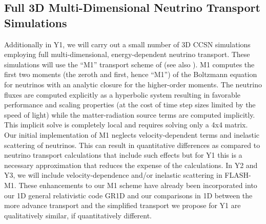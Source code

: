 \subsection{Full 3D Multi-Dimensional Neutrino Transport Simulations}
\label{sec:3Dm1}

Additionally in Y1, we will carry out a small number of 3D CCSN simulations employing full multi-dimensional, energy-dependent neutrino transport.  
These simulations will use the ``M1'' transport scheme of \citet{OConnor:2013ja} (see also \citep{Kuroda:2012fv}).  
M1 computes the first two moments (the zeroth and first, hence ``M1'') of the Boltzmann equation for neutrinos with an analytic closure for the higher-order moments.  
The neutrino fluxes are computed explicitly as a hyperbolic system resulting in favorable performance and scaling properties (at the cost of time step sizes limited by the speed of light) while the matter-radiation source terms are computed implicitly.  
This implicit solve is completely local and requires solving only a 4x4 matrix.
Our initial implementation of M1 neglects velocity-dependent terms and inelastic scattering of neutrinos.
This can result in quantitative differences as compared to neutrino transport calculations that include such effects \citep[see][]{Lentz:2012fy} but for Y1 this is a necessary approximation that reduces the expense of the calculations.
In Y2 and Y3, we will include velocity-dependence and/or inelastic scattering in FLASH-M1.
These enhancements to our M1 scheme have already been incorporated into our 1D general relativistic code GR1D and our comparisons in 1D between the more advance transport and the simplified transport we propose for Y1 are qualitatively similar, if quantitatively different.

